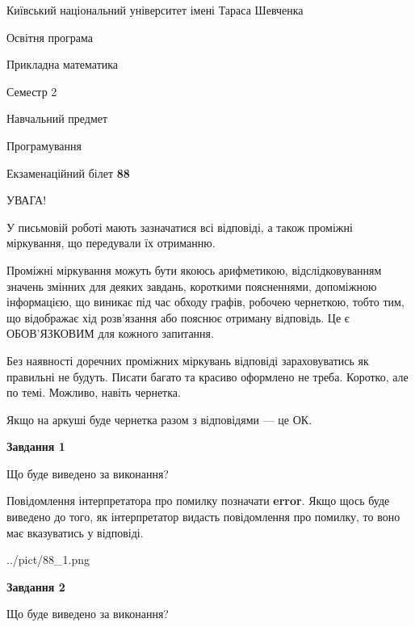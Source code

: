\documentclass[12pt, ukrainian]{article}
\begin{document}
{{\begin {small}\par
{ \center  Київський національний університет імені Тараса Шевченка \par}
{\parbox {5 cm}{Освітня програма \hfill}{\parbox {7 cm}{Прикладна математика \hfill}}\parbox {6 cm}{\hfill Семестр 2}}\par
{\parbox {5 cm} {Навчальний предмет \hfill}\parbox {7 cm}{Програмування \hfill}\parbox {6cm}{\hfill}\par}\vspace{-7pt} \end{small}}{\center Екзаменаційний білет \No \textbf
{ 88 }\par}}
{
\begin {large}
УВАГА!

У письмовій роботі мають зазначатися всі відповіді, а також проміжні міркування, що передували їх отриманню.

Проміжні міркування можуть бути якоюсь арифметикою, відслідковуванням зна\-чень змінних для деяких завдань,
короткими поясненнями, допоміжною інформацією, що виникає під час обходу графів, робочею чернеткою,
тобто тим, що відображає хід розв’язання або пояснює отриману відповідь.
Це є ОБОВ’ЯЗКОВИМ для кожного запитання.

Без наявності доречних проміжних міркувань відповіді зараховуватись як правиль\-ні не будуть.
Писати багато та красиво оформлено не треба. Коротко, але по темі. Можли\-во, навіть чернетка.

Якщо на аркуші буде чернетка разом з відповідями --- це ОК.

\newpage

{\begin {center}\textbf{Завдання 1}\end {center}}\par
Що буде виведено за виконання?

Повідомлення інтерпретатора про помилку позначати \textbf{error}.
Якщо щось буде виведено до того, як інтерпретатор видасть повідомлення про помилку, 
то воно має вказуватись у відповіді. \par


\begin{center}
	{../pict/88_1.png}
\end{center}
\newpage

{\begin {center}\textbf{Завдання 2}\end {center}}\par
Що буде виведено за виконання?


\end{large}}
\end{document}

